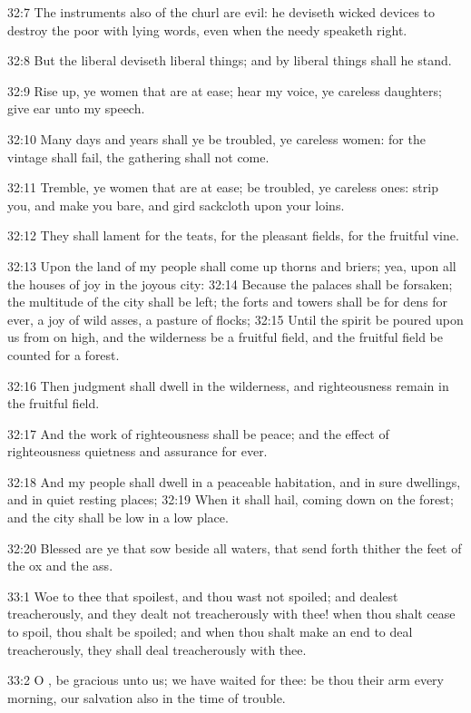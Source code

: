 32:7 The instruments also of the churl are evil: he deviseth wicked
devices to destroy the poor with lying words, even when the needy
speaketh right.

32:8 But the liberal deviseth liberal things; and by liberal things
shall he stand.

32:9 Rise up, ye women that are at ease; hear my voice, ye careless
daughters; give ear unto my speech.

32:10 Many days and years shall ye be troubled, ye careless women: for
the vintage shall fail, the gathering shall not come.

32:11 Tremble, ye women that are at ease; be troubled, ye careless
ones: strip you, and make you bare, and gird sackcloth upon your
loins.

32:12 They shall lament for the teats, for the pleasant fields, for
the fruitful vine.

32:13 Upon the land of my people shall come up thorns and briers; yea,
upon all the houses of joy in the joyous city: 32:14 Because the
palaces shall be forsaken; the multitude of the city shall be left;
the forts and towers shall be for dens for ever, a joy of wild asses,
a pasture of flocks; 32:15 Until the spirit be poured upon us from on
high, and the wilderness be a fruitful field, and the fruitful field
be counted for a forest.

32:16 Then judgment shall dwell in the wilderness, and righteousness
remain in the fruitful field.

32:17 And the work of righteousness shall be peace; and the effect of
righteousness quietness and assurance for ever.

32:18 And my people shall dwell in a peaceable habitation, and in sure
dwellings, and in quiet resting places; 32:19 When it shall hail,
coming down on the forest; and the city shall be low in a low place.

32:20 Blessed are ye that sow beside all waters, that send forth
thither the feet of the ox and the ass.

33:1 Woe to thee that spoilest, and thou wast not spoiled; and dealest
treacherously, and they dealt not treacherously with thee! when thou
shalt cease to spoil, thou shalt be spoiled; and when thou shalt make
an end to deal treacherously, they shall deal treacherously with thee.

33:2 O \LORD, be gracious unto us; we have waited for thee: be thou
their arm every morning, our salvation also in the time of trouble.

